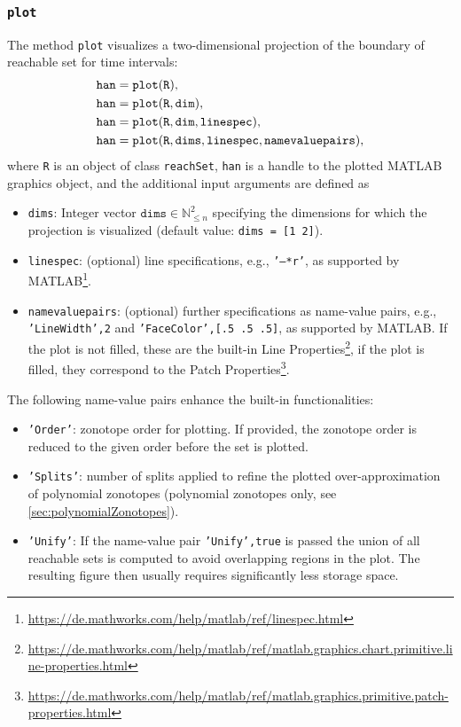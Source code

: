 \subsubsection{\texttt{plot}}

The method \texttt{plot} visualizes a two-dimensional projection of the boundary of reachable set for time intervals:
%
\begin{align*}
	\begin{split}
		&\texttt{han} = {\normalfont \texttt{plot}}(\texttt{R}), \\
		&\texttt{han} = {\normalfont \texttt{plot}}(\texttt{R},\texttt{dim}), \\
		&\texttt{han} = {\normalfont \texttt{plot}}(\texttt{R},\texttt{dim},\texttt{linespec}), \\
		&\texttt{han} = {\normalfont \texttt{plot}}(\texttt{R},\texttt{dims},\texttt{linespec},\texttt{namevaluepairs}),
	\end{split}
\end{align*}
where \texttt{R} is an object of class \texttt{reachSet}, \texttt{han} is a handle to the plotted MATLAB graphics object, and the additional input arguments are defined as

\begin{itemize}
	\item \texttt{dims}: Integer vector $\texttt{dims} \in \mathbb{N}_{\leq n}^2$ specifying the dimensions for which the projection is visualized (default value: \texttt{dims = [1 2]}).
	\item \texttt{linespec}: (optional) line specifications, e.g., \texttt{'--*r'}, as supported by MATLAB\footnote{\url{https://de.mathworks.com/help/matlab/ref/linespec.html}}.
	\item \texttt{namevaluepairs}: (optional) further specifications as name-value pairs, e.g.,
	\texttt{'LineWidth',2} and \texttt{'FaceColor',[.5 .5 .5]}, as supported by MATLAB.
	If the plot is not filled, these are the built-in
	Line Properties\footnote{\url{https://de.mathworks.com/help/matlab/ref/matlab.graphics.chart.primitive.line-properties.html}},
	if the plot is filled, they correspond to the Patch Properties\footnote{\url{https://de.mathworks.com/help/matlab/ref/matlab.graphics.primitive.patch-properties.html}}.
\end{itemize}
%
The following name-value pairs enhance the built-in functionalities:
\begin{itemize}
	\item \texttt{'Order'}: zonotope order for plotting. If provided,
		the zonotope order is reduced to the given order before the set is plotted.
	\item \texttt{'Splits'}: number of splits applied to refine the plotted over-approximation
		of polynomial zonotopes (polynomial zonotopes only, see \cref{sec:polynomialZonotopes}).
	\item \texttt{'Unify'}: If the name-value pair \texttt{'Unify',true} is passed the union of all reachable sets is computed to avoid overlapping regions in the plot. The resulting figure then usually requires significantly less storage space. 
\end{itemize}


